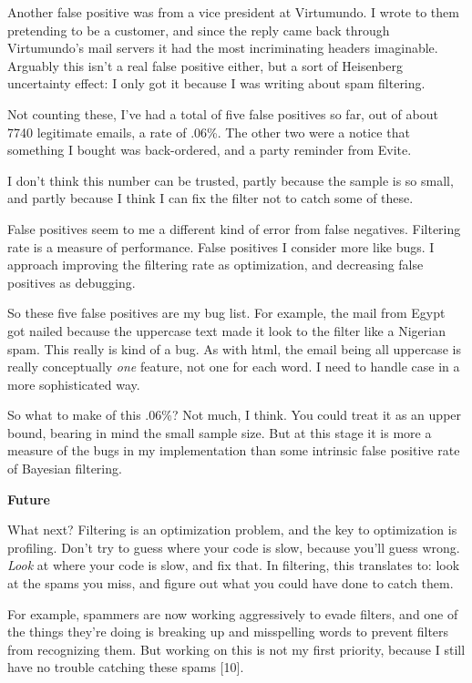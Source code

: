Another false positive was from a vice president at Virtumundo. I wrote
to them pretending to be a customer, and since the reply came back
through Virtumundo's mail servers it had the most incriminating headers
imaginable. Arguably this isn't a real false positive either, but a sort
of Heisenberg uncertainty effect: I only got it because I was writing
about spam filtering.

Not counting these, I've had a total of five false positives so far, out
of about 7740 legitimate emails, a rate of .06\%. The other two were a
notice that something I bought was back-ordered, and a party reminder
from Evite.

I don't think this number can be trusted, partly because the sample is
so small, and partly because I think I can fix the filter not to catch
some of these.

False positives seem to me a different kind of error from false
negatives. Filtering rate is a measure of performance. False positives I
consider more like bugs. I approach improving the filtering rate as
optimization, and decreasing false positives as debugging.

So these five false positives are my bug list. For example, the mail
from Egypt got nailed because the uppercase text made it look to the
filter like a Nigerian spam. This really is kind of a bug. As with html,
the email being all uppercase is really conceptually \emph{one} feature,
not one for each word. I need to handle case in a more sophisticated
way.

So what to make of this .06\%? Not much, I think. You could treat it as
an upper bound, bearing in mind the small sample size. But at this stage
it is more a measure of the bugs in my implementation than some
intrinsic false positive rate of Bayesian filtering.

\textbf{Future}

What next? Filtering is an optimization problem, and the key to
optimization is profiling. Don't try to guess where your code is slow,
because you'll guess wrong. \emph{Look} at where your code is slow, and
fix that. In filtering, this translates to: look at the spams you miss,
and figure out what you could have done to catch them.

For example, spammers are now working aggressively to evade filters, and
one of the things they're doing is breaking up and misspelling words to
prevent filters from recognizing them. But working on this is not my
first priority, because I still have no trouble catching these spams
{[}10{]}.

